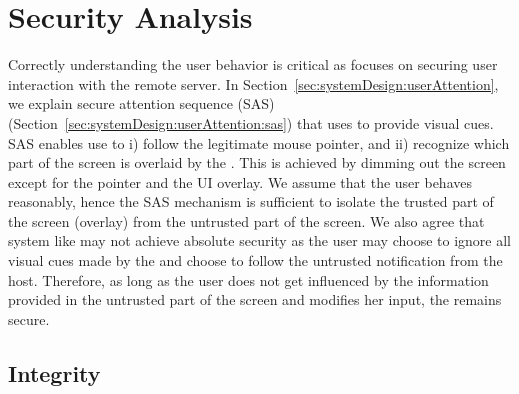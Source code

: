 \section{Security Analysis}
\label{sec:securityAnalysis}





 Correctly understanding the user behavior is critical as \name focuses on securing user interaction with the remote server. In Section~\ref{sec:systemDesign:userAttention}, we explain secure attention sequence (SAS) (Section~\ref{sec:systemDesign:userAttention:sas}) that \name uses to provide visual cues. SAS enables use to i) follow the legitimate mouse pointer, and ii) recognize which part of the screen is overlaid by the \device. This is achieved by dimming out the screen except for the pointer and the UI overlay. We assume that the user behaves reasonably, hence the SAS mechanism is sufficient to isolate the trusted part of the screen (\device overlay) from the untrusted part of the screen. We also agree that system like \name may not achieve absolute security as the user may choose to ignore all visual cues made by the \device and choose to follow the untrusted notification from the host. Therefore, as long as the user does not get influenced by the information provided in the untrusted part of the screen and modifies her input, the \name remains secure. %


\subsection{Integrity}
\label{sec:securityAnalysis:integrity}


